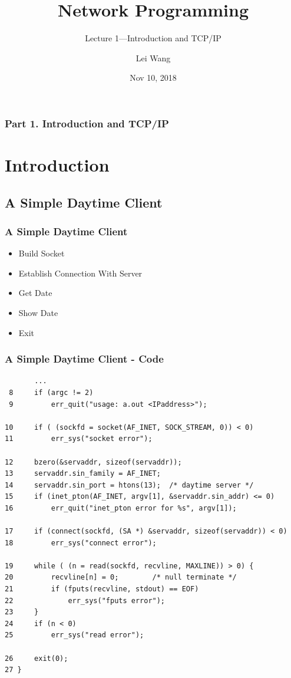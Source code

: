 \documentclass[notes,serif]{beamer}
\title{Network Programming}
\subtitle{Lecture 1---Introduction and TCP/IP}
\author{Lei Wang}
\institute{Dalian University of Technology}
\date{Nov 10, 2018}
\begin{document}
\begin{frame}
  \titlepage
\end{frame}

\begin{frame}
  \frametitle{Part 1. Introduction and TCP/IP}
  \tableofcontents
\end{frame}

\section{Introduction}
\subsection{A Simple Daytime Client}

\begin{frame}
  \frametitle{A Simple Daytime Client}
  \begin{itemize}
  \item Build Socket
  \item Establish Connection With Server
  \item Get Date
  \item Show Date
  \item Exit
  \end{itemize}
\end{frame}


\begin{frame}[containsverbatim]
\frametitle{A Simple Daytime Client - Code}

{\tiny
  \begin{verbatim}
       ...
 8     if (argc != 2)
 9         err_quit("usage: a.out <IPaddress>");

10     if ( (sockfd = socket(AF_INET, SOCK_STREAM, 0)) < 0)
11         err_sys("socket error");

12     bzero(&servaddr, sizeof(servaddr));
13     servaddr.sin_family = AF_INET;
14     servaddr.sin_port = htons(13);  /* daytime server */
15     if (inet_pton(AF_INET, argv[1], &servaddr.sin_addr) <= 0)
16         err_quit("inet_pton error for %s", argv[1]);

17     if (connect(sockfd, (SA *) &servaddr, sizeof(servaddr)) < 0)
18         err_sys("connect error");

19     while ( (n = read(sockfd, recvline, MAXLINE)) > 0) {
20         recvline[n] = 0;        /* null terminate */
21         if (fputs(recvline, stdout) == EOF)
22             err_sys("fputs error");
23     }
24     if (n < 0)
25         err_sys("read error");

26     exit(0);
27 }
  \end{verbatim}
  }
\end{frame}
\end{document}
